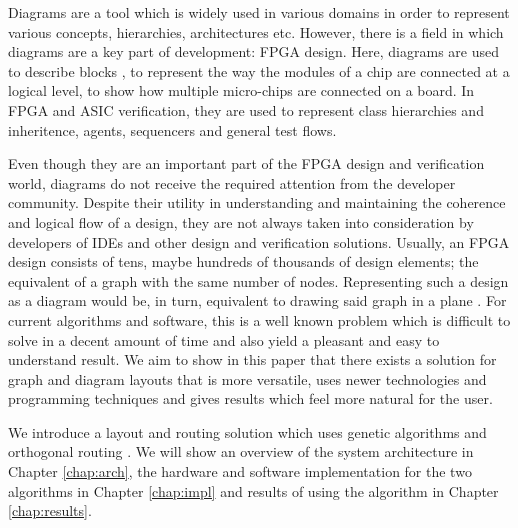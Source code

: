 Diagrams are a tool which is widely used in various domains in order to represent
various concepts, hierarchies, architectures etc. However, there is a field in 
which diagrams are a key part of development: FPGA design. Here, diagrams are used
to describe blocks \cite{jeon2007verification}, to represent the way the modules of a chip are connected at a 
logical level, to show how multiple micro-chips are connected on a board. In FPGA 
and ASIC verification, they are used to represent class hierarchies and inheritence, 
agents, sequencers and general test flows.

Even though they are an important part of the FPGA design and verification world, 
diagrams do not receive the required attention from the developer community. Despite 
their utility in understanding and maintaining the coherence and logical flow of a
design, they are not always taken into consideration by developers of IDEs and other 
design and verification solutions. Usually, an FPGA design consists of tens, maybe hundreds 
of thousands of design elements; the equivalent of a graph with the same number of nodes. 
Representing such a design as a diagram would be, in turn, equivalent to drawing said graph 
in a plane \cite{de1990draw}. For current algorithms and software, this is a well known problem which is 
difficult to solve in a decent amount of time and also yield a pleasant and easy to 
understand result. We aim to show in this paper that there exists a solution for graph 
and diagram layouts that is more versatile, uses newer technologies and programming 
techniques and gives results which feel more natural for the user.

We introduce a layout and routing solution which uses genetic algorithms and orthogonal
routing \cite{wybrow2010orthogonal}. We will show an overview of the system architecture in Chapter \ref{chap:arch}, 
the hardware and software implementation for the two algorithms in Chapter \ref{chap:impl} 
and results of using the algorithm in Chapter \ref{chap:results}. 
